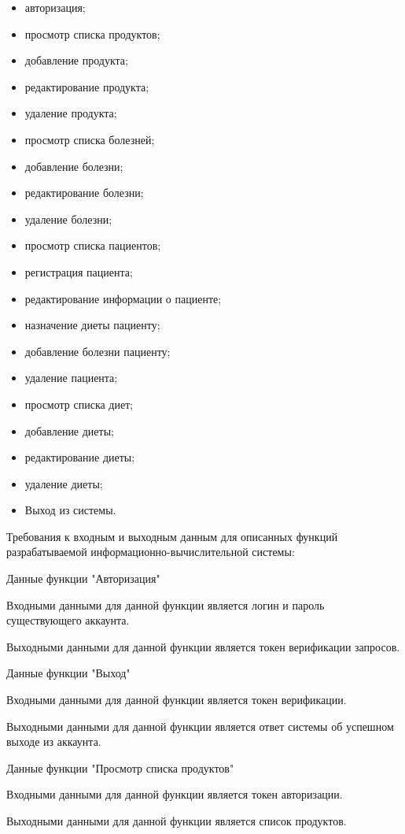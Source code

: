 \begin{itemize}
	\item авторизация;
	\item просмотр списка продуктов;
	\item добавление продукта;
	\item редактирование продукта;
	\item удаление продукта;
	\item просмотр списка болезней;
	\item добавление болезни;
	\item редактирование болезни;
	\item удаление болезни;
	\item просмотр списка пациентов;
	\item регистрация пациента;
	\item редактирование информации о пациенте;
	\item назначение диеты пациенту;
	\item добавление болезни пациенту;
	\item удаление пациента;
	\item просмотр списка диет;
	\item добавление диеты;
	\item редактирование диеты;
	\item удаление диеты;
	\item Выход из системы.
	\end{itemize}
	
Требования к входным и выходным данным для описанных функций разрабатываемой информационно-вычислительной системы:

Данные функции "Авторизация"

Входными данными для данной функции является логин и пароль существующего аккаунта.

Выходными данными для данной функции является токен верификации запросов.

Данные функции "Выход"

Входными данными для данной функции является токен верификации.

Выходными данными для данной функции является ответ системы об успешном выходе из аккаунта.

Данные функции "Просмотр списка продуктов"

Входными данными для данной функции является токен авторизации.

Выходными данными для данной функции является список продуктов.

